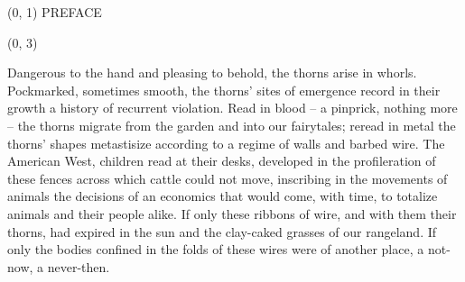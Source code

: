 \documentclass[10pt]{article}
\begin{document}
\begin{textblock}{23}(0, 1)
\center \huge PREFACE
\end{textblock}

\begin{textblock}{23}(0, 3)

Dangerous to the hand and pleasing to behold, the thorns arise in whorls.
Pockmarked, sometimes smooth, the thorns' sites of emergence record in their
growth a history of recurrent violation. Read in blood -- a pinprick, nothing
more -- the thorns migrate from the garden and into our fairytales; reread in
metal the thorns' shapes metastisize according to a regime of walls and barbed
wire. The American West, children read at their desks, developed in the
profileration of these fences across which cattle could not move, inscribing in
the movements of animals the decisions of an economics that would come, with
time, to totalize animals and their people alike. If only these ribbons of
wire, and with them their thorns, had expired in the sun and the clay-caked
grasses of our rangeland. If only the bodies confined in the folds of these
wires were of another place, a not-now, a never-then.

\end{textblock}
\end{document}
